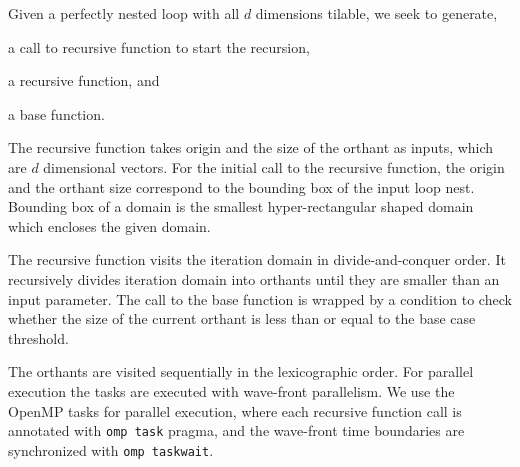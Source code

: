 Given a perfectly nested loop with all $d$ dimensions tilable, we seek to
generate,
\begin{inlinelist}
	\item a call to recursive function to start the recursion,
	\item a recursive function, and
	\item a base function.
\end{inlinelist}  
The recursive function takes origin and the size of the orthant as inputs,
which are $d$ dimensional vectors. For the initial call to the recursive
function, the origin and the orthant size correspond to the bounding box of
the input loop nest.  Bounding box of a domain is the smallest
hyper-rectangular shaped domain which encloses the given domain.

The recursive function visits the iteration domain in divide-and-conquer
order.  It recursively divides iteration domain into orthants until they are
smaller than an input parameter.
The call to the base function is wrapped by a condition to check whether the
size of the current orthant is less than or equal to the base case threshold. 

The orthants are visited sequentially in the lexicographic order.  For
parallel execution the tasks are executed with wave-front parallelism.  We use
the OpenMP tasks for parallel execution, where each recursive function call is
annotated with {\tt omp task} pragma, and the wave-front time boundaries are
synchronized with {\tt omp taskwait}.

